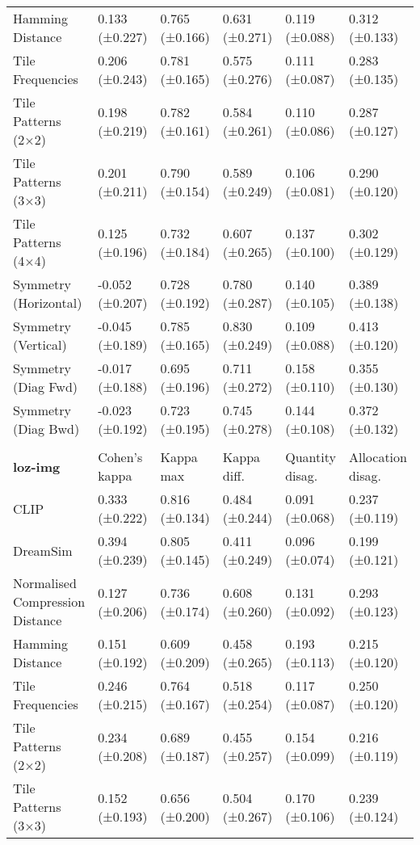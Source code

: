 \begin{tabular}{l|lllll}
Hamming Distance    & 0.133 (±0.227) & 0.765 (±0.166) & 0.631 (±0.271) & 0.119 (±0.088) & 0.312 (±0.133) \\
Tile Frequencies    & 0.206 (±0.243) & 0.781 (±0.165) & 0.575 (±0.276) & 0.111 (±0.087) & 0.283 (±0.135) \\
Tile Patterns (2×2) & 0.198 (±0.219) & 0.782 (±0.161) & 0.584 (±0.261) & 0.110 (±0.086) & 0.287 (±0.127) \\
Tile Patterns (3×3) & 0.201 (±0.211) & 0.790 (±0.154) & 0.589 (±0.249) & 0.106 (±0.081) & 0.290 (±0.120) \\
Tile Patterns (4×4) & 0.125 (±0.196) & 0.732 (±0.184) & 0.607 (±0.265) & 0.137 (±0.100) & 0.302 (±0.129) \\
Symmetry (Horizontal) & -0.052 (±0.207) & 0.728 (±0.192) & 0.780 (±0.287) & 0.140 (±0.105) & 0.389 (±0.138) \\
Symmetry (Vertical) & -0.045 (±0.189) & 0.785 (±0.165) & 0.830 (±0.249) & 0.109 (±0.088) & 0.413 (±0.120) \\
Symmetry (Diag Fwd) & -0.017 (±0.188) & 0.695 (±0.196) & 0.711 (±0.272) & 0.158 (±0.110) & 0.355 (±0.130) \\
Symmetry (Diag Bwd) & -0.023 (±0.192) & 0.723 (±0.195) & 0.745 (±0.278) & 0.144 (±0.108) & 0.372 (±0.132) \\
 & & & & & \\
\textbf{loz-img}    & Cohen's kappa    & Kappa max        & Kappa diff.      & Quantity disag.  & Allocation disag. \\ \hline
CLIP                & 0.333 (±0.222) & 0.816 (±0.134) & 0.484 (±0.244) & 0.091 (±0.068) & 0.237 (±0.119) \\
DreamSim            & 0.394 (±0.239) & 0.805 (±0.145) & 0.411 (±0.249) & 0.096 (±0.074) & 0.199 (±0.121) \\
Normalised Compression Distance & 0.127 (±0.206) & 0.736 (±0.174) & 0.608 (±0.260) & 0.131 (±0.092) & 0.293 (±0.123) \\
Hamming Distance    & 0.151 (±0.192) & 0.609 (±0.209) & 0.458 (±0.265) & 0.193 (±0.113) & 0.215 (±0.120) \\
Tile Frequencies    & 0.246 (±0.215) & 0.764 (±0.167) & 0.518 (±0.254) & 0.117 (±0.087) & 0.250 (±0.120) \\
Tile Patterns (2×2) & 0.234 (±0.208) & 0.689 (±0.187) & 0.455 (±0.257) & 0.154 (±0.099) & 0.216 (±0.119) \\
Tile Patterns (3×3) & 0.152 (±0.193) & 0.656 (±0.200) & 0.504 (±0.267) & 0.170 (±0.106) & 0.239 (±0.124) \\

\end{tabular}
